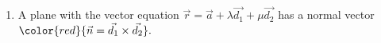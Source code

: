 \documentclass[12pt, a4paper]{article}
\begin{document}
\begin{enumerate}
\begin{proof}{2.5.1}{}
    $$\vec{n}=\begin{pmatrix}n_1\\n_2\\n_3\end{pmatrix},\ d=\vec{a}\cdot\vec{n},\ \vec{r}=\begin{pmatrix}x\\y\\z\end{pmatrix}$$
    The scalar product form converts to: 
    $$\begin{pmatrix}x\\y\\z\end{pmatrix}\cdot\begin{pmatrix}n_1\\n_2\\n_3\end{pmatrix}=\vec{a}\cdot\vec{n}$$
    $$\Rightarrow n_1x+n_2y+n_3z=d.$$
  \end{proof}
  \item A plane with the vector equation $\vec{r}=\vec{a}+\lambda\vec{d_1}+\mu\vec{d_2}$ has a normal vector ${\color{red}{\vec{n}=\vec{d_1}\times\vec{d_2}}}.$
\end{enumerate}
\end{document}
